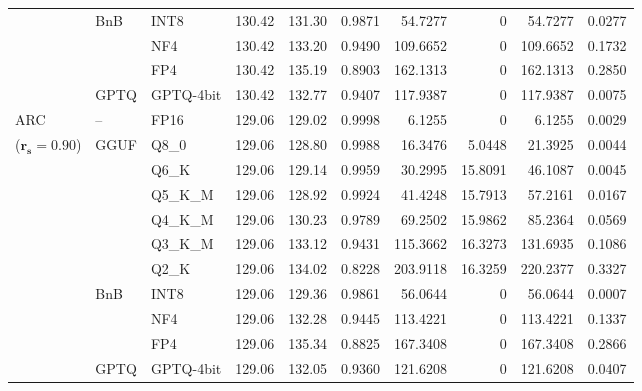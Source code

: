 \begin{longtable}{ll l rrrrrrr}
 & BnB & INT8 & 130.42 & 131.30 & 0.9871 & 54.7277 & \cellcolor{cyan!12} $0$ & 54.7277 & 0.0277 \\
 &  & NF4 & 130.42 & 133.20 & \cellcolor{red!18} 0.9490 & \cellcolor{red!18} 109.6652 & \cellcolor{cyan!12} $0$ & \cellcolor{red!18} 109.6652 & \cellcolor{red!18} 0.1732 \\
 &  & FP4 & 130.42 & 135.19 & \cellcolor{red!18} 0.8903 & \cellcolor{red!18} 162.1313 & \cellcolor{cyan!12} $0$ & \cellcolor{red!18} 162.1313 & \cellcolor{red!18} 0.2850 \\
 & GPTQ & GPTQ-4bit & 130.42 & 132.77 & \cellcolor{red!18} 0.9407 & \cellcolor{red!18} 117.9387 & \cellcolor{cyan!12} $0$ & \cellcolor{red!18} 117.9387 & \cellcolor{red!18} 0.0075 \\
\midrule
ARC & -- & FP16 & 129.06 & 129.02 & 0.9998 & 6.1255 & \cellcolor{cyan!12} $0$ & 6.1255 & 0.0029 \\
{\small ($\mathbf{r_s{=}0.90}$)} & GGUF & Q8\_0 & 129.06 & 128.80 & 0.9988 & 16.3476 & 5.0448 & 21.3925 & 0.0044 \\
 &  & Q6\_K & 129.06 & 129.14 & 0.9959 & 30.2995 & 15.8091 & 46.1087 & 0.0045 \\
 &  & Q5\_K\_M & 129.06 & 128.92 & 0.9924 & 41.4248 & 15.7913 & 57.2161 & 0.0167 \\
 &  & Q4\_K\_M & 129.06 & 130.23 & 0.9789 & 69.2502 & 15.9862 & 85.2364 & 0.0569 \\
 &  & Q3\_K\_M & 129.06 & 133.12 & \cellcolor{red!18} 0.9431 & \cellcolor{red!18} 115.3662 & 16.3273 & \cellcolor{red!18} 131.6935 & \cellcolor{red!18} 0.1086 \\
 &  & Q2\_K & 129.06 & 134.02 & \cellcolor{red!18} 0.8228 & \cellcolor{red!18} 203.9118 & 16.3259 & \cellcolor{red!18} 220.2377 & \cellcolor{red!18} 0.3327 \\
 & BnB & INT8 & 129.06 & 129.36 & 0.9861 & 56.0644 & \cellcolor{cyan!12} $0$ & 56.0644 & 0.0007 \\
 &  & NF4 & 129.06 & 132.28 & \cellcolor{red!18} 0.9445 & \cellcolor{red!18} 113.4221 & \cellcolor{cyan!12} $0$ & \cellcolor{red!18} 113.4221 & \cellcolor{red!18} 0.1337 \\
 &  & FP4 & 129.06 & 135.34 & \cellcolor{red!18} 0.8825 & \cellcolor{red!18} 167.3408 & \cellcolor{cyan!12} $0$ & \cellcolor{red!18} 167.3408 & \cellcolor{red!18} 0.2866 \\
 & GPTQ & GPTQ-4bit & 129.06 & 132.05 & \cellcolor{red!18} 0.9360 & \cellcolor{red!18} 121.6208 & \cellcolor{cyan!12} $0$ & \cellcolor{red!18} 121.6208 & \cellcolor{red!18} 0.0407 \\

\end{longtable}

